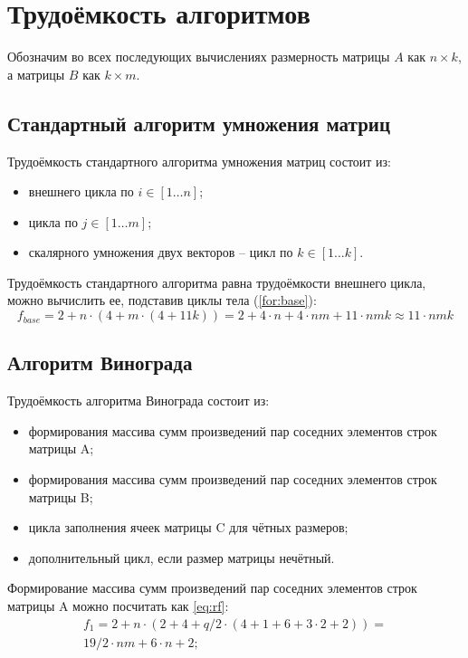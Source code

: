 \section{Трудоёмкость алгоритмов}

Обозначим во всех последующих вычислениях размерность матрицы $A$ как $n \times k$, а матрицы $B$ как $k \times m$.

\subsection{Стандартный алгоритм умножения матриц}

Трудоёмкость стандартного алгоритма умножения матриц состоит из:
\begin{itemize}
	\item внешнего цикла по $i \in [1 \dots n]$;
	\item цикла по $j \in [1 \dots m]$;
	\item скалярного умножения двух векторов -- цикл по $k \in [1 \dots k]$.
\end{itemize}

Трудоёмкость стандартного алгоритма равна трудоёмкости внешнего цикла, можно вычислить ее, подставив циклы тела (\ref{for:base}):
\begin{equation}
	\label{for:base}
	f_{base} = 2 + n \cdot (4 + m \cdot (4 + 11k)) = 2 + 4 \cdot n + 4 \cdot nm + 11 \cdot nmk \approx 11 \cdot nmk
\end{equation}

\subsection{Алгоритм Винограда}

Трудоёмкость алгоритма Винограда состоит из:
\begin{itemize}
	\item формирования массива сумм произведений пар соседних элементов строк матрицы A;
	\item формирования массива сумм произведений пар соседних элементов строк матрицы B;
	\item цикла заполнения ячеек матрицы C для чётных размеров;
    \item дополнительный цикл, если размер матрицы нечётный.
\end{itemize}

Формирование массива сумм произведений пар соседних элементов строк матрицы A можно посчитать как \ref{eq:rf}:
\begin{equation}
    \label{eq:rf}
	\begin{array}{c}
	f_1 = 2 + n  \cdot(2 + 4 + q/2  \cdot (4 + 1 + 6 + 3  \cdot 2 + 2)) =  \\
		19/2 \cdot nm + 6 \cdot n + 2 ;
	\end{array}
\end{equation}

